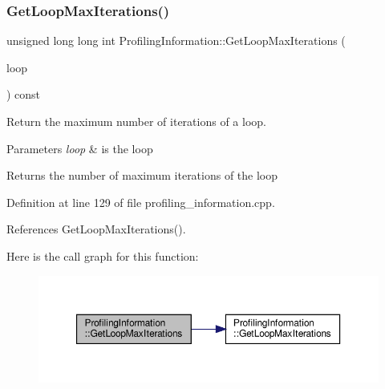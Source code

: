 \subsubsection{\texorpdfstring{Get\+Loop\+Max\+Iterations()}{GetLoopMaxIterations()}\hspace{0.1cm}{\footnotesize\ttfamily [2/2]}}
{\footnotesize\ttfamily unsigned long long int Profiling\+Information\+::\+Get\+Loop\+Max\+Iterations (\begin{DoxyParamCaption}\item[{const Loop\+Const\+Ref}]{loop }\end{DoxyParamCaption}) const}



Return the maximum number of iterations of a loop. 


\begin{DoxyParams}{Parameters}
{\em loop} & is the loop \\
\hline
\end{DoxyParams}
\begin{DoxyReturn}{Returns}
the number of maximum iterations of the loop 
\end{DoxyReturn}


Definition at line 129 of file profiling\+\_\+information.\+cpp.



References Get\+Loop\+Max\+Iterations().

Here is the call graph for this function\+:
\nopagebreak
\begin{figure}[H]
\begin{center}
\leavevmode
\includegraphics[width=350pt]{dd/d5b/classProfilingInformation_a32103f572280605cf93ff372a1d1421f_cgraph}
\end{center}
\end{figure}
\mbox{\label{classProfilingInformation_a0842ba563f306987e4c42fc0e5ad252e}} 
